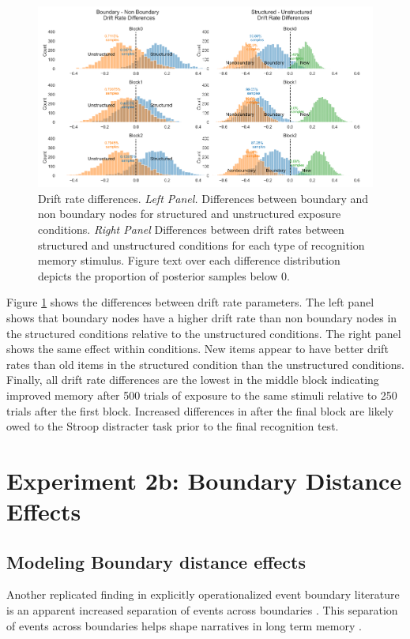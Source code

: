 \begin{figure}
    \centering
    \includegraphics[width = \textwidth]{chapter_notebooks/chapter_3/figures/ddm_vdiff_comb.png}
    \caption{Drift rate differences. \textit{Left Panel.} Differences between boundary and non boundary nodes for structured and unstructured exposure conditions. \textit{Right Panel} Differences between drift rates between structured and unstructured conditions for each type of recognition memory stimulus. Figure text over each difference distribution depicts the proportion of posterior samples below 0.}
    \label{fig:ddm-drift-rates}
\end{figure}

Figure \ref{fig:ddm-drift-rates} shows the differences between drift rate parameters. The left panel shows that boundary nodes have a higher drift rate than non boundary nodes in the structured conditions relative to the unstructured conditions. The right panel shows the same effect within conditions. New items appear to have better drift rates than old items in the structured condition than the unstructured conditions. Finally, all drift rate differences are the lowest in the middle block indicating improved memory after 500 trials of exposure to the same stimuli relative to 250 trials after the first block. Increased differences in after the final block are likely owed to the Stroop distracter task prior to the final recognition test. 



\section{Experiment 2b: Boundary Distance Effects}
\subsection*{Modeling Boundary distance effects}
Another replicated finding in explicitly operationalized event boundary literature is an apparent increased separation of events across boundaries \cite{horner2016role,brunec2018boundaries,dubrow2013influence, ezzyat2011constitutes, heusser2018perceptual}. This separation of events across boundaries helps shape narratives in long term memory \cite{clewett2019transcending}.

